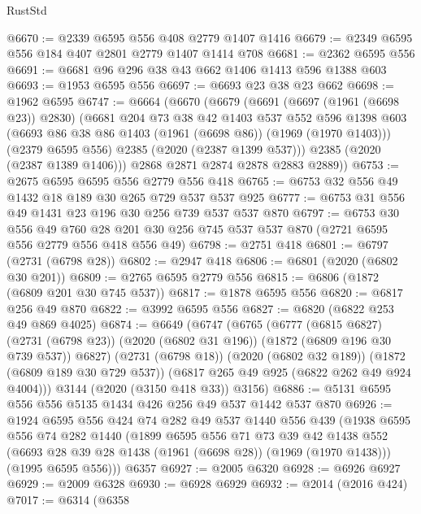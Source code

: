 \begin{lexlean}{RustStd}
\begin{coremodule}
@6670 := @2339 @6595 @556 @408 @2779 @1407 @1416
@6679 := @2349 @6595 @556 @184 @407 @2801 @2779 @1407 @1414 @708
@6681 := @2362 @6595 @556
@6691 := @6681 @96 @296 @38 @43 @662 @1406 @1413 @596 @1388 @603
@6693 := @1953 @6595 @556
@6697 := @6693 @23 @38 @23 @662
@6698 := @1962 @6595
@6747 := @6664
    (@6670
      (@6679
        (@6691
          (@6697 (@1961 (@6698 @23)) @2830)
          (@6681
            @204
            @73
            @38
            @42
            @1403
            @537
            @552
            @596
            @1398
            @603
            (@6693 @86 @38 @86 @1403 (@1961 (@6698 @86)) (@1969 (@1970 @1403)))
            (@2379 @6595 @556)
            @2385
            (@2020 (@2387 @1399 @537)))
          @2385
          (@2020 (@2387 @1389 @1406)))
        @2868
        @2871
        @2874
        @2878
        @2883
        @2889))
@6753 := @2675 @6595 @6595 @556 @2779 @556 @418
@6765 := @6753 @32 @556 @49 @1432 @18 @189 @30 @265 @729 @537 @537 @925
@6777 := @6753 @31 @556 @49 @1431 @23 @196 @30 @256 @739 @537 @537 @870
@6797 := @6753
    @30
    @556
    @49
    @760
    @28
    @201
    @30
    @256
    @745
    @537
    @537
    @870
    (@2721 @6595 @556 @2779 @556 @418 @556 @49)
@6798 := @2751 @418
@6801 := @6797 (@2731 (@6798 @28))
@6802 := @2947 @418
@6806 := @6801 (@2020 (@6802 @30 @201))
@6809 := @2765 @6595 @2779 @556
@6815 := @6806 (@1872 (@6809 @201 @30 @745 @537))
@6817 := @1878 @6595 @556
@6820 := @6817 @256 @49 @870
@6822 := @3992 @6595 @556
@6827 := @6820 (@6822 @253 @49 @869 @4025)
@6874 := @6649
    (@6747
      (@6765
        (@6777
          (@6815 @6827)
          (@2731 (@6798 @23))
          (@2020 (@6802 @31 @196))
          (@1872 (@6809 @196 @30 @739 @537))
          @6827)
        (@2731 (@6798 @18))
        (@2020 (@6802 @32 @189))
        (@1872 (@6809 @189 @30 @729 @537))
        (@6817 @265 @49 @925 (@6822 @262 @49 @924 @4004)))
      @3144
      (@2020 (@3150 @418 @33))
      @3156)
@6886 := @5131 @6595 @556 @556 @5135 @1434 @426 @256 @49 @537 @1442 @537 @870
@6926 := @1924
    @6595
    @556
    @424
    @74
    @282
    @49
    @537
    @1440
    @556
    @439
    (@1938
      @6595
      @556
      @74
      @282
      @1440
      (@1899
        @6595
        @556
        @71
        @73
        @39
        @42
        @1438
        @552
        (@6693 @28 @39 @28 @1438 (@1961 (@6698 @28)) (@1969 (@1970 @1438)))
        (@1995 @6595 @556)))
    @6357
@6927 := @2005 @6320
@6928 := @6926 @6927
@6929 := @2009 @6328
@6930 := @6928 @6929
@6932 := @2014 (@2016 @424)
@7017 := @6314
    (@6358

\end{coremodule}
\end{lexlean}
